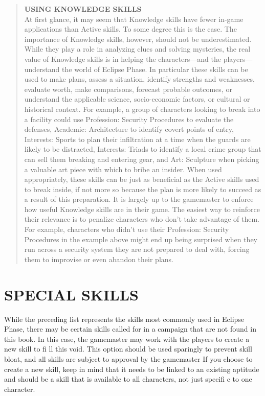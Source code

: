 \begin{quotation}
\textbf{USING KNOWLEDGE SKILLS}
\\
At first glance, it may seem that Knowledge skills have
fewer in-game applications than Active skills. To some
degree this is the case. The importance of Knowledge
skills, however, should not be underestimated. While
they play a role in analyzing clues and solving mysteries, the real value of Knowledge skills is in helping the
characters—and the players—understand the world of
Eclipse Phase. In particular these skills can be used to
make plans, assess a situation, identify strengths and
weaknesses, evaluate worth, make comparisons, forecast
probable outcomes, or understand the applicable science,
socio-economic factors, or cultural or historical context.
   For example, a group of characters looking to break
into a facility could use Profession: Security Procedures
to evaluate the defenses, Academic: Architecture to
identify covert points of entry, Interests: Sports to plan
their infiltration at a time when the guards are likely to
be distracted, Interests: Triads to identify a local crime
group that can sell them breaking and entering gear,
and Art: Sculpture when picking a valuable art piece
with which to bribe an insider. When used appropriately,
these skills can be just as beneficial as the Active skills
used to break inside, if not more so because the plan
is more likely to succeed as a result of this preparation.
   It is largely up to the gamemaster to enforce how
useful Knowledge skills are in their game. The easiest
way to reinforce their relevance is to penalize characters who don’t take advantage of them. For example,
characters who didn’t use their Profession: Security
Procedures in the example above might end up being
surprised when they run across a security system they
are not prepared to deal with, forcing them to improvise or even abandon their plans.
\end{quotation}

\section{SPECIAL SKILLS}
While the preceding list represents the skills most commonly
used in Eclipse Phase, there may be certain skills called for in a
campaign that are not found in this book. In this case, the gamemaster
may work with the players to create a new skill to fi ll
this void. This option should be used sparingly to prevent skill
bloat, and all skills are subject to approval by the gamemaster
If you choose to create a new skill, keep in mind that it needs
to be linked to an existing aptitude and should be a skill that
is available to all characters, not just specifi c to one character.










